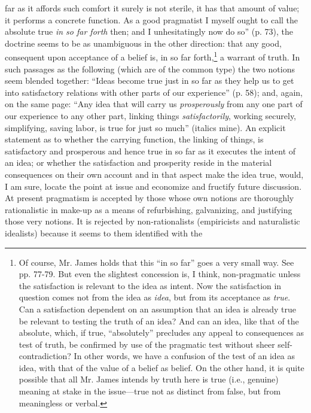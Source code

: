 \documentclass[12pt]{article}
\begin{document}
far as it affords such comfort it surely
is not sterile, it has that amount of value; it performs a concrete
function. As a good pragmatist I myself ought to call the absolute
true \emph{in so far forth} then; and I unhesitatingly now do so'' (p. 73),
the doctrine seems to be as unambiguous in the other direction: that
any good, consequent upon acceptance of a belief is, in so far
forth,\footnote{Of course, Mr. James holds that this ``in so far'' goes a
very small way. See pp. 77-79. But even the slightest concession is, I
think, non-pragmatic unless the satisfaction is relevant to the idea
as intent. Now the satisfaction in question comes not from the idea as
\emph{idea}, but from its acceptance as \emph{true}. Can a satisfaction
dependent on an assumption that an idea is already true be relevant to
testing the truth of an idea? And can an idea, like that of the
absolute, which, if true, ``absolutely'' precludes any appeal to
consequences as test of truth, be confirmed by use of the pragmatic
test without sheer self-contradiction? In other words, we have a
confusion of the test of an idea as idea, with that of the value of a
belief as belief. On the other hand, it is quite possible that all Mr.
James intends by truth here is true (i.e., genuine) meaning at stake
in the issue—true not as distinct from false, but from meaningless or
verbal.} a warrant of truth. In such passages as the following (which
are of the common type) the two notions seem blended together: ``Ideas
become true just in so far as they help us to get
into satisfactory relations with other parts of our experience'' (p.
58); and, again, on the same page: ``Any idea that will carry us
\emph{prosperously} from any one part of our experience to any other part,
linking things \emph{satisfactorily}, working securely, simplifying, saving
labor, is true for just so much'' (italics mine). An explicit statement
as to whether the carrying function, the linking of things, is
satisfactory and prosperous and hence true in so far as it executes
the intent of an idea; or whether the satisfaction and prosperity
reside in the material consequences on their own account and in that
aspect make the idea true, would, I am sure, locate the point at issue
and economize and fructify future discussion. At present pragmatism is
accepted by those whose own notions are thoroughly rationalistic in
make-up as a means of refurbishing, galvanizing, and justifying those
very notions. It is rejected by non-rationalists (empiricists and
naturalistic idealists) because it seems to them identified with the
\end{document}
